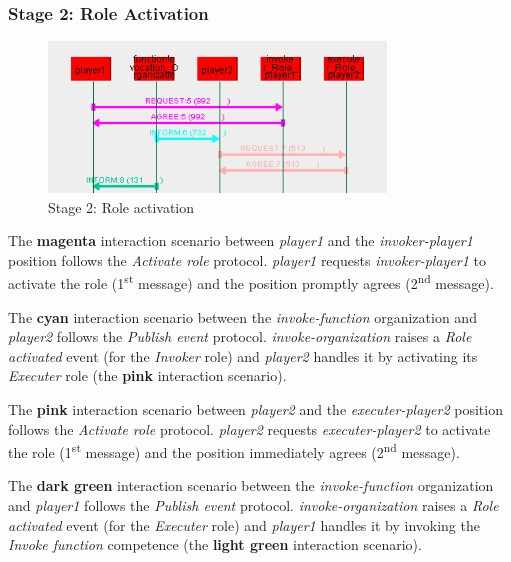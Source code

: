 \subsubsection*{Stage 2: Role Activation}

\begin{figure}[H]
	\centering
	\includegraphics[width=0.8\textwidth]{images/examples/example1-stage2.png}
	\caption{Stage 2: Role activation}
	\label{figure:example1-stage2}
\end{figure}

The \textbf{magenta} interaction scenario between \textit{player1} and the \textit{invoker-player1} position follows the \textit{Activate role} protocol.
\textit{player1} requests \textit{invoker-player1} to activate the role (1\textsuperscript{st} message) and the position promptly agrees (2\textsuperscript{nd} message).

The \textbf{cyan} interaction scenario between the \textit{invoke-function} organization and \textit{player2} follows the \textit{Publish event} protocol.
\textit{invoke-organization} raises a \textit{Role activated} event (for the \textit{Invoker} role) and \textit{player2} handles it by activating its \textit{Executer} role (the \textbf{pink} interaction scenario).

The \textbf{pink} interaction scenario between \textit{player2} and the \textit{executer-player2} position follows the \textit{Activate role} protocol.
\textit{player2} requests \textit{executer-player2} to activate the role (1\textsuperscript{st} message) and the position immediately agrees (2\textsuperscript{nd} message).

The \textbf{dark green} interaction scenario between the \textit{invoke-function} organization and \textit{player1} follows the \textit{Publish event} protocol.
\textit{invoke-organization} raises a \textit{Role activated} event (for the \textit{Executer} role) and \textit{player1} handles it by invoking the \textit{Invoke function} competence (the \textbf{light green} interaction scenario).

